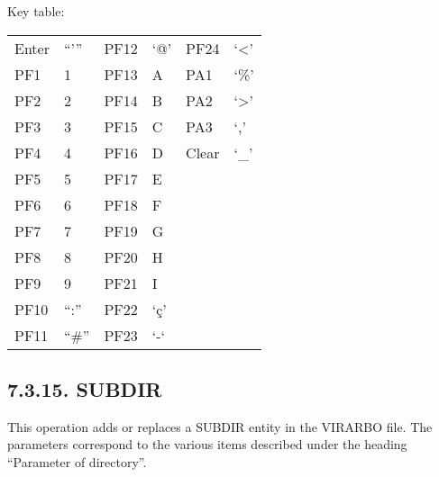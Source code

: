 \documentclass[letterpaper,10pt,english]{sphinxmanual}
\begin{document}
Key table:


\begin{savenotes}\sphinxattablestart
\centering
\begin{tabulary}{\linewidth}[t]{|T|T|T|T|T|T|}
\hline
{}\relax &\relax &\relax &\relax &\relax &\relax \\
\hline
Enter
&
“’”
&
PF12
&
‘@’
&
PF24
&
‘\textless{}’
\\
\hline
PF1
&
1
&
PF13
&
A
&
PA1
&
‘\%’
\\
\hline
PF2
&
2
&
PF14
&
B
&
PA2
&
‘\textgreater{}’
\\
\hline
PF3
&
3
&
PF15
&
C
&
PA3
&
‘,’
\\
\hline
PF4
&
4
&
PF16
&
D
&
Clear
&
‘\_’
\\
\hline
PF5
&
5
&
PF17
&
E
&&\\
\hline
PF6
&
6
&
PF18
&
F
&&\\
\hline
PF7
&
7
&
PF19
&
G
&&\\
\hline
PF8
&
8
&
PF20
&
H
&&\\
\hline
PF9
&
9
&
PF21
&
I
&&\\
\hline
PF10
&
“:”
&
PF22
&
‘ç’
&&\\
\hline
PF11
&
“\#”
&
PF23
&
‘-‘
&&\\
\hline
\end{tabulary}
\par
\sphinxattableend\end{savenotes}


\subsection{7.3.15. SUBDIR}
\label{\detokenize{Installation_Guide:subdir}}
This operation adds or replaces a SUBDIR entity in the VIRARBO file. The parameters correspond to the various items described under the heading “Parameter of directory”.
\end{document}
